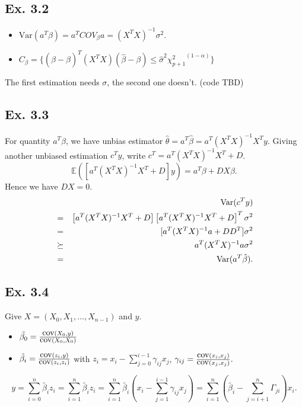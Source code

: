 \subsection*{Ex. 3.2}

\begin{itemize}
	\item $\mbox{Var}(a^{T}\beta) = a^{T}COV_\beta a = (X^{T}X)^{-1}\sigma^2$.
	\item $C_{\beta}=\{(\hat{\beta} - \beta)^T(X^TX)(\hat{\beta} - \beta)\leq \hat{\sigma}^2 {\chi_{p+1}^2}^{(1-\alpha)}\}$
\end{itemize}

The first estimation needs $\sigma$, the second one doesn't. (code TBD)

\subsection*{Ex. 3.3}
For quantity $a^{T}\beta$, we have unbias estimator $\hat{\theta} = a^T\hat{\beta} = a^T (X^{T}X)^{-1}X^{T}y.$ Giving another unbiased estimation $c^{T}y$, write $c^{T} = a^{T}(X^{T}X)^{-1}X^{T} + D$.
$$\mathbb{E}(\left[a^{T}(X^{T}X)^{-1}X^{T} + D\right]y)=a^{T}\beta + DX\beta.$$
Hence we have $DX = 0$.
\begin{eqnarray*}
& & \operatorname*{\mbox{Var}}(c^{T}y) \\
&=& \left[a^{T}(X^{T}X)^{-1}X^{T} + D\right]\left[a^{T}(X^{T}X)^{-1}X^{T} + D\right]^T \sigma^2\\
&=& [a^{T}(X^{T}X)^{-1}a + DD^T]\sigma^2 \\
&\succeq& a^{T}(X^{T}X)^{-1}a\sigma^2 \\
&=& \operatorname*{\mbox{Var}}(a^T\hat{\beta}).
\end{eqnarray*}

\subsection*{Ex. 3.4}
Give $X = (X_0, X_1, ..., X_{n - 1})$ and $y$.
\begin{itemize}
	\item $\tilde{\beta_0} = \frac{\operatorname*{\mbox{cov}}(X_0, y)}{\operatorname*{\mbox{cov}}(X_0, X_0)}$
    \item $\tilde{\beta_i} = \frac{\operatorname*{\mbox{cov}}(z_i, y)}{\operatorname*{\mbox{cov}}(z_i, z_i)}$ with $z_i = x_i - \sum_{j=0}^{i-1} \gamma_{ij} x_j$, $\gamma_{ij} = \frac{\operatorname*{\mbox{cov}}(x_i, x_j)}{\operatorname*{\mbox{cov}}(x_j, x_j)}.$
\end{itemize}
$$y = \sum_{i=0}^{n}\tilde{\beta_i}z_{i} = \sum_{i=1}^{n}\tilde{\beta_i}z_{i}= \sum_{i=1}^{n}\tilde{\beta_i}(x_i - \sum_{j=1}^{i-1} \gamma_{ij} x_j)= \sum_{i=1}^{n}(\tilde{\beta_i}-\sum_{j=i+1}^{n}\Gamma_{ji})x_i.$$

